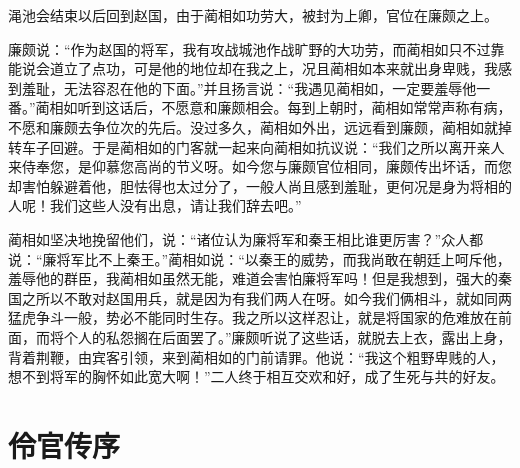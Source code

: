 \documentclass[12pt,UTF-8,openany,a4]{ctexbook}
\begin{document}
\begin{large}
    渑池会结束以后回到赵国，由于蔺相如功劳大，被封为上卿，官位在廉颇之上。
    
    廉颇说：“作为赵国的将军，我有攻战城池作战旷野的大功劳，而蔺相如只不过靠能说会道立了点功，可是他的地位却在我之上，况且蔺相如本来就出身卑贱，我感到羞耻，无法容忍在他的下面。”并且扬言说：“我遇见蔺相如，一定要羞辱他一番。”蔺相如听到这话后，不愿意和廉颇相会。每到上朝时，蔺相如常常声称有病，不愿和廉颇去争位次的先后。没过多久，蔺相如外出，远远看到廉颇，蔺相如就掉转车子回避。于是蔺相如的门客就一起来向蔺相如抗议说：“我们之所以离开亲人来侍奉您，是仰慕您高尚的节义呀。如今您与廉颇官位相同，廉颇传出坏话，而您却害怕躲避着他，胆怯得也太过分了，一般人尚且感到羞耻，更何况是身为将相的人呢！我们这些人没有出息，请让我们辞去吧。”
    
    蔺相如坚决地挽留他们，说：“诸位认为廉将军和秦王相比谁更厉害？”众人都说：“廉将军比不上秦王。”蔺相如说：“以秦王的威势，而我尚敢在朝廷上呵斥他，羞辱他的群臣，我蔺相如虽然无能，难道会害怕廉将军吗！但是我想到，强大的秦国之所以不敢对赵国用兵，就是因为有我们两人在呀。如今我们俩相斗，就如同两猛虎争斗一般，势必不能同时生存。我之所以这样忍让，就是将国家的危难放在前面，而将个人的私怨搁在后面罢了。”廉颇听说了这些话，就脱去上衣，露出上身，背着荆鞭，由宾客引领，来到蔺相如的门前请罪。他说：“我这个粗野卑贱的人，想不到将军的胸怀如此宽大啊！”二人终于相互交欢和好，成了生死与共的好友。
    

\end{large}



\chapter{伶官传序}
\end{document}
